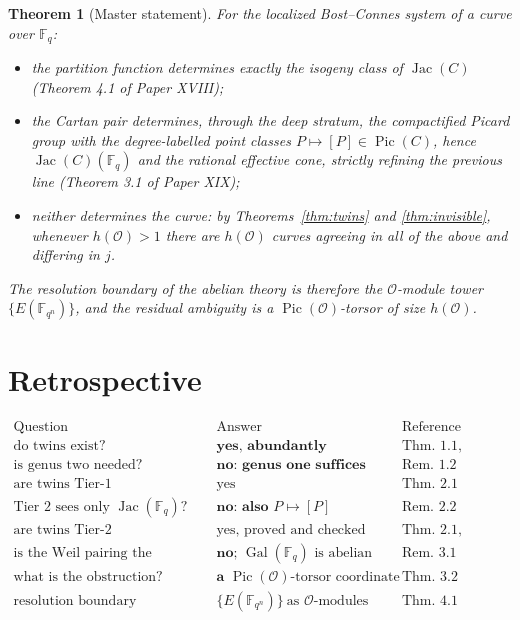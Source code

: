 \documentclass[11pt]{amsart}
\numberwithin{equation}{section}
\newtheorem{theorem}{Theorem}[section]
\theoremstyle{definition}
\theoremstyle{remark}
\newcommand{\F}{\mathbb{F}}
\newcommand{\cO}{\mathcal{O}}
\newcommand{\Pic}{\operatorname{Pic}}
\newcommand{\Jac}{\operatorname{Jac}}
\newcommand{\Gal}{\operatorname{Gal}}
\begin{document}
\begin{theorem}[Master statement]\label{thm:master}
For the localized Bost--Connes system of a curve over $\F_q$:
\begin{itemize}
\item the partition function determines exactly the isogeny class of $\Jac(C)$
(Theorem 4.1 of Paper XVIII);
\item the Cartan pair determines, through the deep stratum, the compactified Picard group
with the degree-labelled point classes $P\mapsto[P]\in\Pic(C)$,
hence $\Jac(C)(\F_q)$ and the rational effective cone, strictly refining the previous line
(Theorem 3.1 of Paper XIX);
\item neither determines the curve: by Theorems~\ref{thm:twins} and \ref{thm:invisible},
whenever $h(\cO)>1$ there are $h(\cO)$ curves agreeing in all of the above and differing in
$j$.
\end{itemize}
The resolution boundary of the abelian theory is therefore the $\cO$-module tower
$\{E(\F_{q^n})\}$, and the residual ambiguity is a $\Pic(\cO)$-torsor of size $h(\cO)$.
\end{theorem}

\section{Retrospective}

\[
\begin{array}{lll}
\text{Question} & \text{Answer} & \text{Reference}\\\hline
\text{do twins exist?} & \textbf{yes, abundantly} & \text{Thm.~1.1, Ex.~1.3}\\
\text{is genus two needed?} & \textbf{no: genus one suffices} & \text{Rem.~1.2}\\
\text{are twins Tier-1 indistinguishable?} & \text{yes} & \text{Thm.~2.1}\\
\text{Tier 2 sees only }\Jac(\F_q)? & \textbf{no: also }P\mapsto[P] & \text{Rem.~2.2}\\
\text{are twins Tier-2 indistinguishable?} & \text{yes, proved and checked} & \text{Thm.~2.1, Rem.~2.3}\\
\text{is the Weil pairing the obstruction?} & \textbf{no; }\Gal(\F_q)\text{ is abelian} & \text{Rem.~3.1}\\
\text{what is the obstruction?} & \textbf{a }\Pic(\cO)\text{-torsor coordinate} & \text{Thm.~3.2}\\
\text{resolution boundary} & \{E(\F_{q^n})\}\ \text{as }\cO\text{-modules} & \text{Thm.~4.1}
\end{array}
\]
\end{document}
